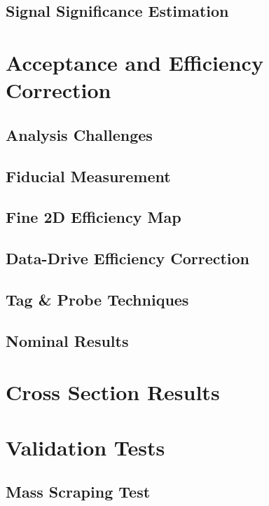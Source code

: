 \subsection{Signal Significance Estimation}

\section{Acceptance and Efficiency Correction} 

\subsection{Analysis Challenges}

\subsection{Fiducial Measurement}

\subsection{Fine 2D Efficiency Map}

\subsection{Data-Drive Efficiency Correction}

\subsection{Tag \& Probe Techniques}

\subsection{Nominal Results}

\section{Cross Section Results} 

\section{Validation Tests} 

\subsection{Mass Scraping Test}

